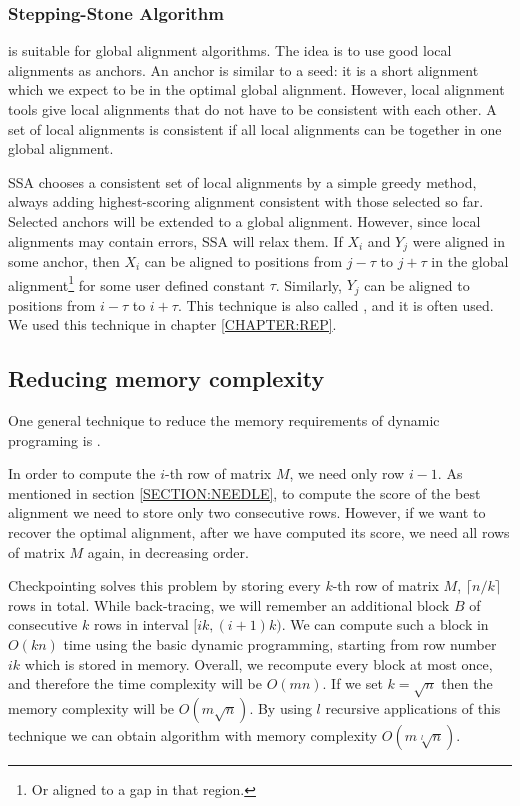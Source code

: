\subsubsection{Stepping-Stone Algorithm}
\label{SECTION:SSA}

\cite{Meyer2002,Pairagon2009} is suitable for global alignment algorithms. The idea is to
use good local alignments as anchors. An anchor is similar to a seed: it is a
short alignment which we expect to be in the optimal global alignment.
However, local alignment tools give local alignments that do not have to be
consistent with each other. A set of local alignments is consistent if all
local alignments can be together in one global alignment.

SSA chooses a consistent set of local alignments  by a simple greedy method,
always adding highest-scoring alignment consistent with those selected so far.
Selected anchors will be extended to a global alignment. However, since local
alignments may contain errors, SSA will relax them. If $X_i$ and $Y_j$ were
aligned in some anchor, then $X_i$ can be aligned to positions from $j-\tau$ to
$j+\tau$ in the global alignment\footnote{Or aligned to a gap in that region.}
for some user defined constant $\tau$. Similarly, $Y_j$ can be aligned to
positions from $i-\tau$ to $i+\tau$. This technique is also called ,
and it is often used. We used this technique in chapter \ref{CHAPTER:REP}.

\subsection{Reducing memory complexity}
One general technique to reduce the memory requirements of dynamic programing
is  \cite{Grice1997}.

In order to compute the $i$-th row of matrix $M$, we need only row $i-1$. As
mentioned in section \ref{SECTION:NEEDLE}, to compute the score of the best
alignment we need to store only
two consecutive rows.  However, if we want to
recover the optimal alignment, after we have computed its score, we need all
rows of matrix $M$ again, in decreasing order.

Checkpointing solves this problem by storing every $k$-th row of matrix $M$,
$\lceil n/k\rceil$ rows in total.  While back-tracing, we will remember an
additional block $B$ of consecutive $k$ rows in interval $[ik,(i+1)k)$. We can
compute such a block in $O(kn)$ time using the basic dynamic programming,
starting from row number $ik$ which is stored in memory.  Overall, we recompute
every block at most once, and therefore the time complexity will be $O(mn)$.
If we set $k=\sqrt n$ then the memory complexity will be $O(m\sqrt n)$. By
using $l$ recursive applications of this technique we can obtain algorithm with
memory complexity $O(m\sqrt[l]{ n})$.

